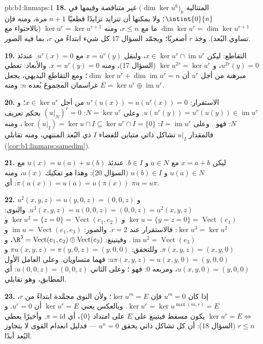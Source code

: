 \begin{solution}{pb:b1:linmaps:1}
\textbf{18.} المتتالية $\bigl(\dim\ker u^k\bigr)_k$
غير متناقصة وقيمها في $\intint{0}{n}$؛ ولا يمكنها أن تتزايد
تزايدًا قطعيًا $n + 1$ مرة، ومنه فإن $\dim\ker u^{r} = \dim\ker
u^{r+1}$ ما مع $r \leq n$، ومنه $\ker u^{r} = \ker u^{r+1}$
(بالاحتواء مع تساوي البُعد). وخذ $r$ أصغريًا؛ ويجمّد السؤال 17
كل شيء ابتداءً من $r$، بما فيه الصور.

\textbf{19.} التقاطع: ليكن $x \in \ker u^{r} \cap
\operatorname{im} u^{r}$، ولنقل $x = u^{r}(y)$ مع $u^{r}(x) =
0$. عندئذ $u^{2r}(y) = 0$، و $\ker u^{2r} = \ker u^{r}$
(السؤال 17)، ومنه $x = u^{r}(y) = 0$. والأبعاد: تعطي مبرهنة 
من أجل $u^{r}$ أن $\dim\ker u^{r} + \dim\operatorname{im} u^{r}
= n$؛ ومع التقاطع البديهي، يجعل غراسمان المجموعَ
 بُعده $n$: ومنه $E = \ker u^{r} \oplus
\operatorname{im} u^{r}$.

\textbf{20.} الاستقرار: $u^{r}(u(x)) = u(u^{r}(x)) = 0$ من أجل $x
\in \ker u^{r}$؛ و $u(u^{r}(y)) = u^{r}(u(y)) \in
\operatorname{im} u^{r}$. وعلى $N = \ker u^{r}$: $(u|_N)^{r} = 0$
بحكم تعريف $N$: فهو . وعلى $I = \operatorname{im}
u^{r}$: $\ker(u|_I) = \ker u \cap I \subseteq \ker u^{r} \cap I
= \{0\}$، ومنه فالمقدار $u|_I$ تشاكل ذاتي متباين للفضاء
$I$ ذي البُعد المنتهي، ومنه تقابلي
(\cref{cor:b1:linmaps:samedim}).

\textbf{21.} ليكن $x = a + b$ مع $a \in N$ و $b \in I$. عندئذ
$u(x) = u(a) + u(b)$ مع $u(a) \in N$ و $u(b) \in I$
(السؤال 20): وهذا \emph{هو} تفكيك $u(x)$، ومنه
$\pi(u(x)) = u(a) = u(\pi(x))$: أي $\pi u = u\pi$.

\textbf{22.} $u^2(x,y,z) = u(y, 0, z) = (0, 0, z)$ و
$u^3(x,y,z) = u(0,0,z) = (0,0,z) = u^2(x,y,z)$. والنوى: $\ker u
= \{y = z = 0\} = \operatorname{Vect}(e_1)$ و $\ker u^2 = \{z =
0\} = \operatorname{Vect}(e_1, e_2)$ و $\ker u^3 = \ker u^2$:
فالاستقرار عند $r = 2$. والصور: $\operatorname{im} u =
\operatorname{Vect}(e_1, e_3)$ و $\operatorname{im} u^2 =
\operatorname{Vect}(e_3)$. وفيتينغ: $\R^3 =
\operatorname{Vect}(e_1, e_2) \oplus \operatorname{Vect}(e_3)$،
و $\pi(x, y, z) = (x, y, 0)$. وللتحقق: $\pi u(x,y,z) = \pi(y, 0,
z) = (y, 0, 0)$ و $u\pi(x,y,z) = u(x, y, 0) = (y, 0, 0)$:
فهما متساويان. وعلى العامل الأول $u(x, y, 0) = (y, 0, 0)$، ومربعه
$0$: فهو ؛ وعلى الثاني $u(0,0,z) = (0,0,z)$:
أي  المطابق، وهو تقابلي.

\textbf{23.} إذا كان $u^m = 0$ فإن $\ker u^m = E$؛ ولأن النوى
مجمَّدة ابتداءً من $r$، $\ker u^{r} = \ker u^{\max(m, r)} = E$.
وبالعكس يعني $\ker u^{r} = E$ أن $u^{r} = 0$. و $\ker u^{r} =
E \iff$ يكون مسقط فيتينغ على $E$ على امتداد $\{0\}$، أي
$\pi = \mathrm{id}$. وأخيرًا يعطي $r \leq n$ (السؤال 18):
أن كل تشاكل ذاتي  يحقق $u^{n} = 0$ --- فدليل
انعدام القوى لا يتجاوز البُعد أبدًا.


\end{solution}
